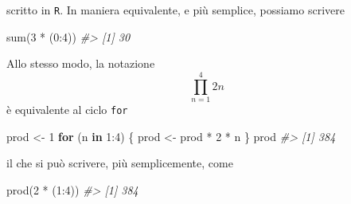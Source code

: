 \documentclass[
]{memoir}
\newenvironment{Shaded}{\begin{snugshade}}{\end{snugshade}}
\newcommand{\CommentTok}[1]{\textcolor[rgb]{0.56,0.35,0.01}{\textit{#1}}}
\newcommand{\ControlFlowTok}[1]{\textcolor[rgb]{0.13,0.29,0.53}{\textbf{#1}}}
\newcommand{\DecValTok}[1]{\textcolor[rgb]{0.00,0.00,0.81}{#1}}
\newcommand{\FunctionTok}[1]{\textcolor[rgb]{0.00,0.00,0.00}{#1}}
\newcommand{\NormalTok}[1]{#1}
\newcommand{\OtherTok}[1]{\textcolor[rgb]{0.56,0.35,0.01}{#1}}
\newcommand{\SpecialCharTok}[1]{\textcolor[rgb]{0.00,0.00,0.00}{#1}}
\theoremstyle{definition}
\theoremstyle{definition}
\theoremstyle{definition}
\theoremstyle{definition}
\theoremstyle{remark}
\begin{document}
scritto in \texttt{R}. In maniera equivalente, e più semplice, possiamo scrivere

\begin{Shaded}
\begin{Highlighting}[]
\FunctionTok{sum}\NormalTok{(}\DecValTok{3} \SpecialCharTok{*}\NormalTok{ (}\DecValTok{0}\SpecialCharTok{:}\DecValTok{4}\NormalTok{))}
\CommentTok{\#\textgreater{} [1] 30}
\end{Highlighting}
\end{Shaded}

Allo stesso modo, la notazione
\[
\prod_{n=1}^{4} 2n
\]
è equivalente al ciclo \texttt{for}

\begin{Shaded}
\begin{Highlighting}[]
\NormalTok{prod }\OtherTok{\textless{}{-}} \DecValTok{1}
\ControlFlowTok{for}\NormalTok{ (n }\ControlFlowTok{in} \DecValTok{1}\SpecialCharTok{:}\DecValTok{4}\NormalTok{) \{}
\NormalTok{  prod }\OtherTok{\textless{}{-}}\NormalTok{ prod }\SpecialCharTok{*} \DecValTok{2} \SpecialCharTok{*}\NormalTok{ n}
\NormalTok{\}}
\NormalTok{prod}
\CommentTok{\#\textgreater{} [1] 384}
\end{Highlighting}
\end{Shaded}

il che si può scrivere, più semplicemente, come

\begin{Shaded}
\begin{Highlighting}[]
\FunctionTok{prod}\NormalTok{(}\DecValTok{2} \SpecialCharTok{*}\NormalTok{ (}\DecValTok{1}\SpecialCharTok{:}\DecValTok{4}\NormalTok{))}
\CommentTok{\#\textgreater{} [1] 384}
\end{Highlighting}
\end{Shaded}


  
\end{document}
